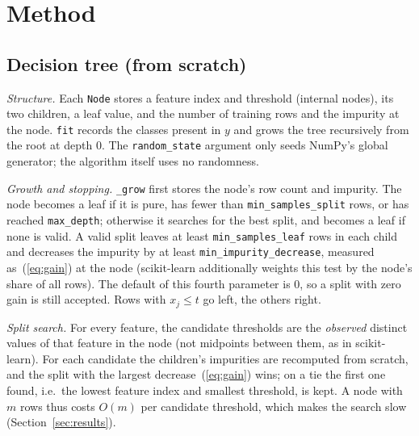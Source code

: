 \documentclass[10pt,twocolumn,a4paper]{article}
\begin{document}
\section{Method}
\subsection{Decision tree (from scratch)}
\textit{Structure.} Each \texttt{Node} stores a feature index and
threshold (internal nodes), its two children, a leaf value, and the number
of training rows and the impurity at the node. %
\texttt{fit} records the classes present in $y$ and grows the tree
recursively from the root at depth 0. %
The \texttt{random\_state} argument only seeds NumPy's global generator;
the algorithm itself uses no randomness. %

\textit{Growth and stopping.} \texttt{\_grow} first stores the node's row
count and impurity. The node becomes a leaf if it is pure, has fewer than
\texttt{min\_samples\_split} rows, or has reached \texttt{max\_depth}; %
otherwise it searches for the best split, and becomes a leaf if none is
valid. A valid split leaves at least \texttt{min\_samples\_leaf} rows in
each child %
and decreases the impurity by at least \texttt{min\_impurity\_decrease},
measured as~(\ref{eq:gain}) at the node (scikit-learn additionally
weights this test by the node's share of all rows). %
The default of this fourth parameter is 0, so a split with zero gain is
still accepted. %
Rows with $x_j \le t$ go left, the others right.

\textit{Split search.} For every feature, the candidate thresholds are the
\emph{observed} distinct values of that feature in the node (not
midpoints between them, as in scikit-learn). For each candidate the
children's impurities are recomputed from scratch, and the split with the
largest decrease~(\ref{eq:gain}) wins; on a tie the first one found, i.e.\
the lowest feature index and smallest threshold, is kept. %
A node with $m$ rows thus costs $O(m)$ per candidate threshold, which
makes the search slow (Section~\ref{sec:results}).
\end{document}
